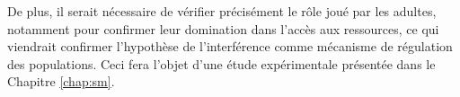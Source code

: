 De plus, il serait nécessaire de vérifier précisément le rôle joué par les
adultes, notamment pour confirmer leur domination dans l'accès aux ressources,
ce qui viendrait confirmer l'hypothèse de l'interférence comme mécanisme de
régulation des populations. Ceci fera l'objet d'une étude expérimentale
présentée dans le Chapitre \ref{chap:sm}.


